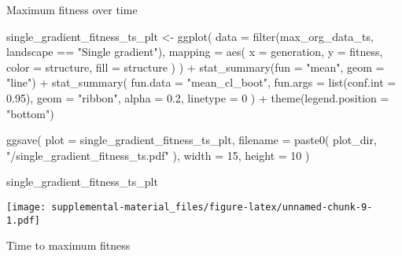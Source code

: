 \documentclass[
]{book}
\newenvironment{Shaded}{\begin{snugshade}}{\end{snugshade}}
\newcommand{\AttributeTok}[1]{\textcolor[rgb]{0.77,0.63,0.00}{#1}}
\newcommand{\DecValTok}[1]{\textcolor[rgb]{0.00,0.00,0.81}{#1}}
\newcommand{\FloatTok}[1]{\textcolor[rgb]{0.00,0.00,0.81}{#1}}
\newcommand{\FunctionTok}[1]{\textcolor[rgb]{0.00,0.00,0.00}{#1}}
\newcommand{\NormalTok}[1]{#1}
\newcommand{\OtherTok}[1]{\textcolor[rgb]{0.56,0.35,0.01}{#1}}
\newcommand{\SpecialCharTok}[1]{\textcolor[rgb]{0.00,0.00,0.00}{#1}}
\newcommand{\StringTok}[1]{\textcolor[rgb]{0.31,0.60,0.02}{#1}}
\begin{document}
Maximum fitness over time

\begin{Shaded}
\begin{Highlighting}[]
\NormalTok{single\_gradient\_fitness\_ts\_plt }\OtherTok{\textless{}{-}} \FunctionTok{ggplot}\NormalTok{(}
    \AttributeTok{data =} \FunctionTok{filter}\NormalTok{(max\_org\_data\_ts, landscape }\SpecialCharTok{==} \StringTok{"Single gradient"}\NormalTok{),}
    \AttributeTok{mapping =} \FunctionTok{aes}\NormalTok{(}
      \AttributeTok{x =}\NormalTok{ generation,}
      \AttributeTok{y =}\NormalTok{ fitness,}
      \AttributeTok{color =}\NormalTok{ structure,}
      \AttributeTok{fill =}\NormalTok{ structure}
\NormalTok{    )}
\NormalTok{  ) }\SpecialCharTok{+}
  \FunctionTok{stat\_summary}\NormalTok{(}\AttributeTok{fun =} \StringTok{"mean"}\NormalTok{, }\AttributeTok{geom =} \StringTok{"line"}\NormalTok{) }\SpecialCharTok{+}
  \FunctionTok{stat\_summary}\NormalTok{(}
    \AttributeTok{fun.data =} \StringTok{"mean\_cl\_boot"}\NormalTok{,}
    \AttributeTok{fun.args =} \FunctionTok{list}\NormalTok{(}\AttributeTok{conf.int =} \FloatTok{0.95}\NormalTok{),}
    \AttributeTok{geom =} \StringTok{"ribbon"}\NormalTok{,}
    \AttributeTok{alpha =} \FloatTok{0.2}\NormalTok{,}
    \AttributeTok{linetype =} \DecValTok{0}
\NormalTok{  ) }\SpecialCharTok{+}
  \FunctionTok{theme}\NormalTok{(}\AttributeTok{legend.position =} \StringTok{"bottom"}\NormalTok{)}

\FunctionTok{ggsave}\NormalTok{(}
  \AttributeTok{plot =}\NormalTok{ single\_gradient\_fitness\_ts\_plt,}
  \AttributeTok{filename =} \FunctionTok{paste0}\NormalTok{(}
\NormalTok{    plot\_dir,}
    \StringTok{"/single\_gradient\_fitness\_ts.pdf"}
\NormalTok{  ),}
  \AttributeTok{width =} \DecValTok{15}\NormalTok{,}
  \AttributeTok{height =} \DecValTok{10}
\NormalTok{)}

\NormalTok{single\_gradient\_fitness\_ts\_plt}
\end{Highlighting}
\end{Shaded}

\texttt{[image: supplemental-material\_files/figure-latex/unnamed-chunk-9-1.pdf]}

Time to maximum fitness
\end{document}

